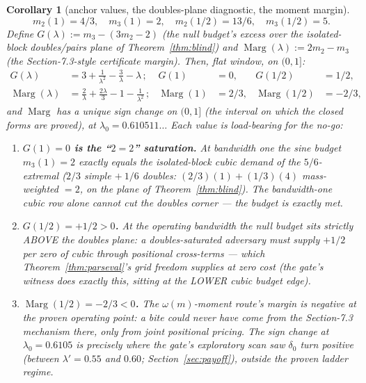 \documentclass[11pt]{article}
\theoremstyle{plain}
\newtheorem{corollary}[theorem]{Corollary}
\theoremstyle{definition}
\theoremstyle{remark}
\newcommand{\Marg}{\operatorname{Marg}}
\begin{document}
\begin{corollary}[anchor values, the doubles-plane diagnostic, the moment margin]
\label{cor:anchors}
\[
  m_2(1) = 4/3, \quad m_3(1) = 2, \quad m_2(1/2) = 13/6, \quad m_3(1/2) = 5.
\]
Define $G(\lambda) := m_3 - (3 m_2 - 2)$ (the null budget's excess over the
isolated-block doubles/pairs plane of Theorem~\ref{thm:blind}) and
$\Marg(\lambda) := 2 m_2 - m_3$ (the Section-7.3-style certificate margin). Then,
flat window, on $(0, 1]$:
\begin{align*}
  G(\lambda) &= 3 + \frac{1}{\lambda^2} - \frac{3}{\lambda} - \lambda \,;
    & G(1) &= 0, & G(1/2) &= 1/2,\\
  \Marg(\lambda) &= \frac{2}{\lambda} + \frac{2\lambda}{3} - 1
    - \frac{1}{\lambda^2} \,;
    & \Marg(1) &= 2/3, & \Marg(1/2) &= -2/3,
\end{align*}
and $\Marg$ has a unique sign change on $(0, 1]$ (the interval on which the
closed forms are proved), at $\lambda_0 = 0.610511\ldots$ Each value is
load-bearing for the no-go:
\begin{enumerate}
\item \textbf{$G(1) = 0$ is the ``$2 = 2$'' saturation.} At bandwidth one the
  sine budget $m_3(1) = 2$ exactly equals the isolated-block cubic demand of the
  $5/6$-extremal ($2/3$ simple $+\ 1/6$ doubles: $(2/3)(1) + (1/3)(4)$
  mass-weighted $= 2$, on the plane of Theorem~\ref{thm:blind}). The bandwidth-one
  cubic row alone cannot cut the doubles corner --- the budget is exactly met.
\item \textbf{$G(1/2) = +1/2 > 0$.} At the operating bandwidth the null budget
  sits strictly ABOVE the doubles plane: a doubles-saturated adversary must
  supply $+1/2$ per zero of cubic through positional cross-terms --- which
  Theorem~\ref{thm:parseval}'s grid freedom supplies at zero cost (the gate's
  witness does exactly this, sitting at the LOWER cubic budget edge).
\item \textbf{$\Marg(1/2) = -2/3 < 0$.} The $\omega(m)$-moment route's margin is
  negative at the proven operating point: a bite could never have come from the
  Section-7.3 mechanism there, only from joint positional pricing. The sign change
  at $\lambda_0 = 0.6105$ is precisely where the gate's exploratory scan saw
  $\delta_0$ turn positive (between $\lambda' = 0.55$ and $0.60$;
  Section~\ref{sec:payoff}), outside the proven ladder regime.
\end{enumerate}
\end{corollary}
\end{document}
